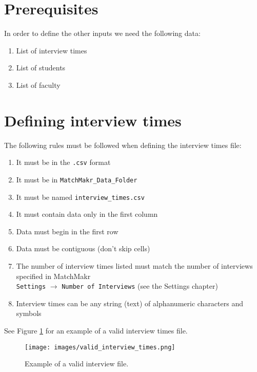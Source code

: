 %
%
\section{Prerequisites}

In order to define the other inputs we need the following data:

\begin{enumerate}
	\item List of interview times
	\item List of students
	\item List of faculty
\end{enumerate}

%
%
\section{Defining interview times}

The following rules must be followed when defining the interview times file:
\begin{enumerate}
	\item It must be in the \texttt{.csv} format
	\item It must be in \texttt{MatchMakr\_Data\_Folder}
	\item It must be named \texttt{interview\_times.csv}
	\item It must contain data only in the first column
	\item Data must begin in the first row
	\item Data must be contiguous (don't skip cells)
	\item The number of interview times listed must match the number of interviews specified in MatchMakr \\
		\texttt{Settings} $\rightarrow$ \texttt{Number of Interviews} (see the Settings chapter)
	\item Interview times can be any string (text) of alphanumeric characters and symbols
\end{enumerate}

See Figure \ref{fig:valid_interview_times} for an example of a valid interview times file.

\begin{figure}
	\centering
	\texttt{[image: images/valid\_interview\_times.png]}
	\caption{\label{fig:valid_interview_times} Example of a valid interview file.}
\end{figure}



